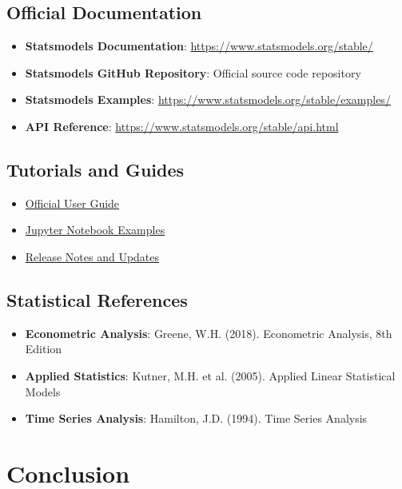\subsection{Official Documentation}
\begin{itemize}
	\item \textbf{Statsmodels Documentation}: \url{https://www.statsmodels.org/stable/}
	\item \textbf{Statsmodels GitHub Repository}: Official source code repository \cite{Statsmodels:2024}
	\item \textbf{Statsmodels Examples}: \url{https://www.statsmodels.org/stable/examples/}
	\item \textbf{API Reference}: \url{https://www.statsmodels.org/stable/api.html}
\end{itemize}

\subsection{Tutorials and Guides}
\begin{itemize}
	\item \href{https://www.statsmodels.org/stable/user-guide.html}{Official User Guide}
	\item \href{https://www.statsmodels.org/stable/examples/notebooks/generated/}{Jupyter Notebook Examples}
	\item \href{https://www.statsmodels.org/stable/release/index.html}{Release Notes and Updates}
\end{itemize}

\subsection{Statistical References}
\begin{itemize}
	\item \textbf{Econometric Analysis}: Greene, W.H. (2018). Econometric Analysis, 8th Edition
	\item \textbf{Applied Statistics}: Kutner, M.H. et al. (2005). Applied Linear Statistical Models
	\item \textbf{Time Series Analysis}: Hamilton, J.D. (1994). Time Series Analysis
\end{itemize}

\section{Conclusion}
\label{sec:conclusion}

